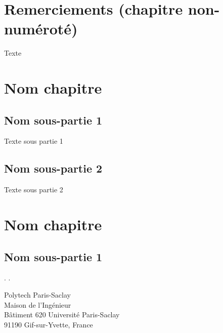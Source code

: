 \documentclass[french,12pt,a4paper]{report}
\begin{document}
\newpage

\setcounter{page}{1} 

\chapter*{Remerciements (chapitre non-numéroté)}

Texte 

\chapter{Nom chapitre}
\section{Nom sous-partie 1}

\par Texte sous partie 1

\section{Nom sous-partie 2}

\par Texte sous partie 2

\newpage
\chapter{Nom chapitre}
\section{Nom sous-partie 1}

\newpage
.
\newpage
.

\selectfont

\small




\vspace{\fill} %

\noindent
\color{BleuFonce} \footnotesize 
Polytech Paris-Saclay \\
Maison de l'Ingénieur\\
Bâtiment 620 Université Paris-Saclay\\
91190 Gif-sur-Yvette, France
\end{document}
